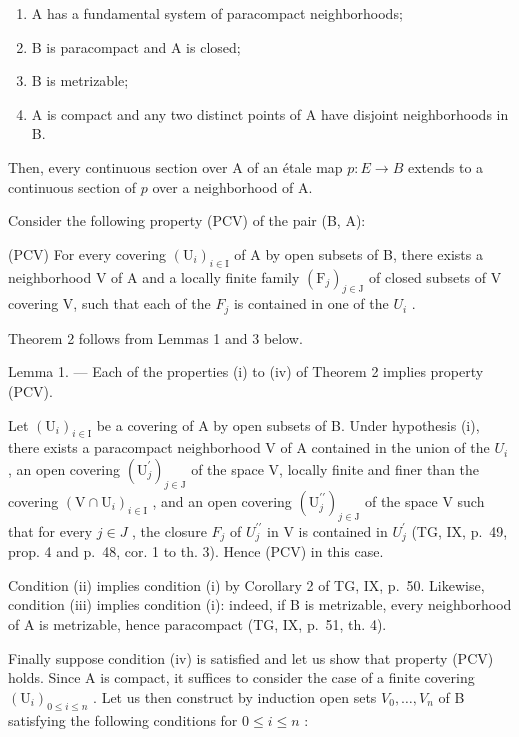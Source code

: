 \begin{enumerate}
\def\labelenumi{(\roman{enumi})}
\item
  A has a fundamental system of paracompact neighborhoods;
\item
  B is paracompact and A is closed;
\item
  B is metrizable;
\item
  A is compact and any two distinct points of A have disjoint neighborhoods in B.
\end{enumerate}

Then, every continuous section over A of an étale map \(p\colon E \to B\) extends to a continuous section of \(p\) over a neighborhood of A.

Consider the following property (PCV) of the pair (B, A):

(PCV) For every covering \((\mathrm{U}_{i})_{i\in\mathrm{I}}\) of A by open subsets of B, there exists a neighborhood V of A and a locally finite family \((\mathrm{F}_{j})_{j\in\mathrm{J}}\) of closed subsets of V covering V, such that each of the \(F_{j}\) is contained in one of the \(U_{i}\) .

Theorem 2 follows from Lemmas 1 and 3 below.

Lemma 1. --- Each of the properties (i) to (iv) of Theorem 2 implies property (PCV).

Let \((\mathrm{U}_{i})_{i\in\mathrm{I}}\) be a covering of A by open subsets of B. Under hypothesis (i), there exists a paracompact neighborhood V of A contained in the union of the \(U_{i}\) , an open covering \((\mathrm{U}_{j}^{\prime})_{j\in\mathrm{J}}\) of the space V, locally finite and finer than the covering \((\mathrm{V}\cap\mathrm{U}_{i})_{i\in\mathrm{I}}\) , and an open covering \((\mathrm{U}_{j}^{\prime\prime})_{j\in\mathrm{J}}\) of the space V such that for every \(j\in J\) , the closure \(F_{j}\) of \(U_{j}^{\prime\prime}\) in V is contained in \(U_{j}^{\prime}\) (TG, IX, p.~49, prop. 4 and p.~48, cor. 1 to th. 3). Hence (PCV) in this case.

Condition (ii) implies condition (i) by Corollary 2 of TG, IX, p.~50. Likewise, condition (iii) implies condition (i): indeed, if B is metrizable, every neighborhood of A is metrizable, hence paracompact (TG, IX, p.~51, th. 4).

Finally suppose condition (iv) is satisfied and let us show that property (PCV) holds. Since A is compact, it suffices to consider the case of a finite covering \((\mathrm{U}_{i})_{0\leqslant i\leqslant n}\) . Let us then construct by induction open sets \(V_{0},\ldots,V_{n}\) of B satisfying the following conditions for \(0\leqslant i\leqslant n\) :

